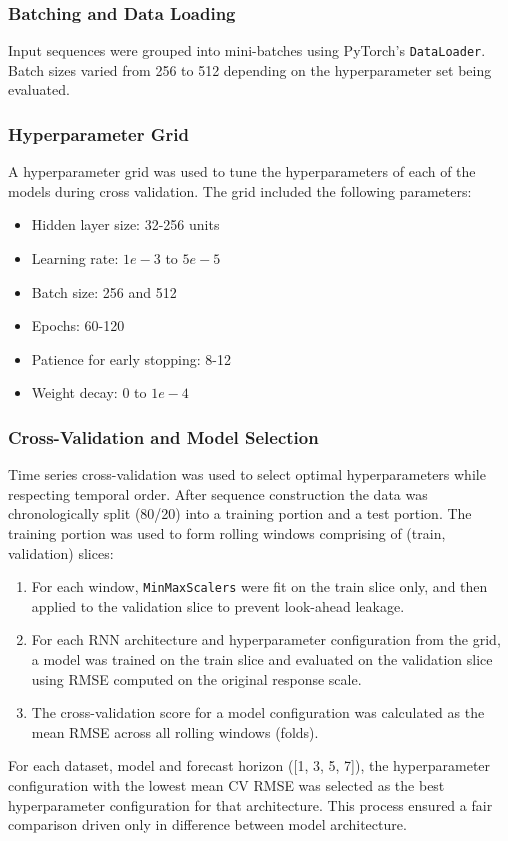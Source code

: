 \documentclass[conference]{IEEEtran}
\begin{document}
\subsubsection{\textbf{Batching and Data Loading}}
Input sequences were grouped into mini-batches using PyTorch's \texttt{DataLoader}. Batch sizes varied from 256 to 512 depending on the hyperparameter set being evaluated.

\subsubsection{\textbf{Hyperparameter Grid}}
A hyperparameter grid was used to tune the hyperparameters of each of the models during cross validation. The grid included the following parameters:
\begin{itemize}
    \item Hidden layer size: 32-256 units
    \item Learning rate: $1e-3$ to $5e-5$
    \item Batch size: 256 and 512
    \item Epochs: 60-120
    \item Patience for early stopping: 8-12
    \item Weight decay: $0$ to $1e-4$
\end{itemize}

\subsubsection{\textbf{Cross-Validation and Model Selection}}
Time series cross-validation was used to select optimal hyperparameters while respecting temporal order. After sequence construction the data was chronologically split (80/20) into a training portion and a test portion. The training portion was used to form rolling windows comprising of (train, validation) slices:
\begin{enumerate}
    \item For each window, \texttt{MinMaxScalers} were fit on the train slice only, and then applied to the validation slice to prevent look-ahead leakage.
    \item For each RNN architecture and hyperparameter configuration from the grid, a model was trained on the train slice and evaluated on the validation slice using RMSE computed on the original response scale.
    \item The cross-validation score for a model configuration was calculated as the mean RMSE across all rolling windows (folds).
\end{enumerate}
For each dataset, model and forecast horizon ([1, 3, 5, 7]), the hyperparameter configuration with the lowest mean CV RMSE was selected as the best hyperparameter configuration for that architecture. This process ensured a fair comparison driven only in difference between model architecture.
\end{document}
